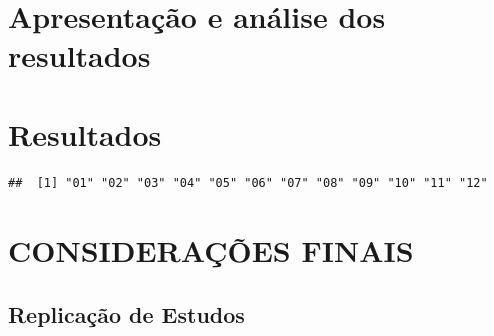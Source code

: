 \documentclass[12pt,12pt,openright,oneside,a4paper,chapter=TITLE,section=TITLE,subsection=TITLE,subsubsection=TITLE,english,french,spanish,portugues,sumario=tradicional]{abntex2}
\begin{document}
\chapter{Apresentação e análise dos resultados}

\chapter{Resultados}

\begin{verbatim}
##  [1] "01" "02" "03" "04" "05" "06" "07" "08" "09" "10" "11" "12"
\end{verbatim}


\chapter*[Conclusão]{CONSIDERAÇÕES FINAIS}

\postextual


\postextual


{\begin{apendicesenv}

\renewcommand{\thechapter}{\arabic{chapter}}

\chapter{Replicação de Estudos}
\section{}
 
\end{apendicesenv}
}{}



\printbibliography
\end{document}
